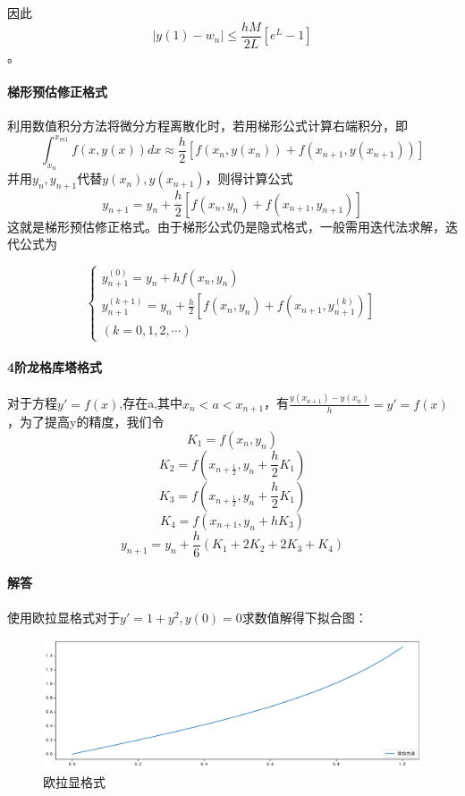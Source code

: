 因此$$\left|y\left(1\right) - w_{n} \right| \leq \frac{hM}{2L}\left[ e^{L}-1\right] $$。

\paragraph{梯形预估修正格式}

利用数值积分方法将微分方程离散化时，若用梯形公式计算右端积分，即
$$\int_{x_{n}}^{x_{m 1}} f(x, y(x)) d x \approx \frac{h}{2}\left[f\left(x_{n}, y\left(x_{n}\right)\right)+f\left(x_{n+1}, y\left(x_{n+1}\right)\right)\right]$$
并用$y_n,y_{n+1}$代替$y(x_n),y(x_{n+1})$，则得计算公式
$$y_{n+1}=y_{n}+\frac{h}{2}\left[f\left(x_{n}, y_{n}\right)+f\left(x_{n+1}, y_{n+1}\right)\right]$$
这就是梯形预估修正格式。由于梯形公式仍是隐式格式，一般需用迭代法求解，迭代公式为

$$\left \{ \begin{array}{l}{y_{n+1}^{(0)}=y_{n}+h f\left(x_{n}, y_{n}\right)} \\ {y_{n+1}^{(k+1)}=y_{n}+\frac{h}{2}\left[f\left(x_{n}, y_{n}\right)+f\left(x_{n+1}, y_{n+1}^{(k)}\right)\right]} \\ {(k=0,1,2, \cdots)}\end{array}\right.$$

\paragraph{4阶龙格库塔格式}

对于方程$y'=f(x)$,存在a,其中$x_n<a<x_{n+1}$，有$\frac{y(x_{n+1})-y(x_n)}{h}=y'=f(x)$，为了提高y的精度，我们令
$$K_1=f(x_n,y_n)$$$$K_2=f(x_{n+\frac{1}{2}},y_n+\frac{h}{2}K_1)$$$$K_3=f(x_{n+\frac{1}{2}},y_n+\frac{h}{2}K_1)$$$$K_4=f(x_{n+1},y_n+hK_3)$$$$y_{n+1}=y_n+\frac{h}{6}(K_1+2K_2+2K_3+K_4)$$


\paragraph{解答}


使用欧拉显格式对于$y'=1+y^2,y(0)=0$求数值解得下拟合图：

\begin{figure}[H]
	\centering
	\caption{欧拉显格式}
	\includegraphics[width=\linewidth]{6-1.pdf}
\end{figure}

